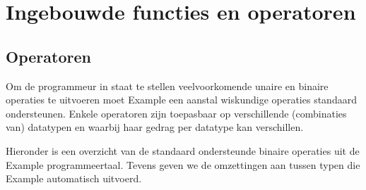\chapter{Ingebouwde functies en operatoren}
\section{Operatoren}
Om de programmeur in staat te stellen veelvoorkomende unaire en binaire operaties te uitvoeren moet Example een aanstal wiskundige operaties standaard ondersteunen. Enkele operatoren zijn toepasbaar op verschillende (combinaties van) datatypen en waarbij haar gedrag per datatype kan verschillen. 

Hieronder is een overzicht van de standaard ondersteunde binaire operaties uit de Example programmeertaal. Tevens geven we de omzettingen aan tussen typen die Example automatisch uitvoerd.

